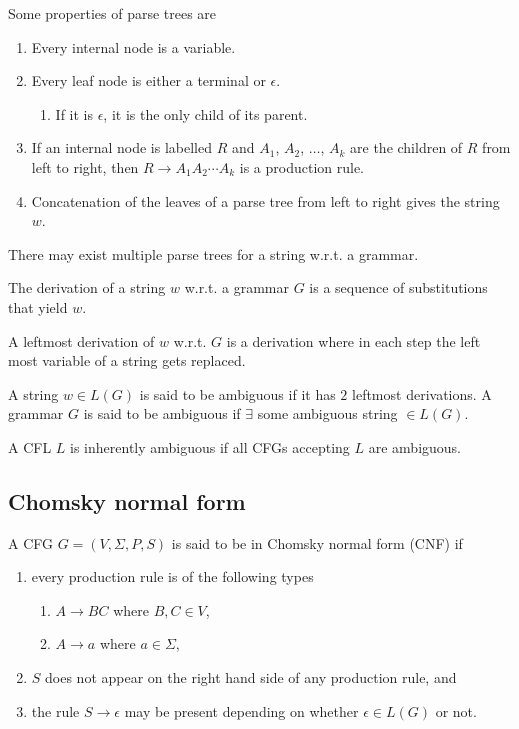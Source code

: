 \documentclass{article}
\begin{document}
Some properties of parse trees are

\begin{enumerate}
\item\label{item:25} Every internal node is a variable. 
\item\label{item:24} Every leaf node is either a terminal or $\epsilon$. 
\begin{enumerate}
\item\label{item:27} If it is $\epsilon$, it is the only child of its parent.
\end{enumerate} 
\item\label{item:28} If an internal node is labelled $R$ and $A_1$, $A_2$, $\ldots$, $A_k$ are the children of $R$ from left to right, then $R \to A_1A_2\cdots A_k$ is a production rule. 
\item\label{item:29} Concatenation of the leaves of a parse tree from left to right gives the string $w$.
\end{enumerate}

There may exist multiple parse trees for a string w.r.t. a grammar.

The derivation of a string $w$ w.r.t. a grammar $G$ is a sequence of substitutions that yield $w$.

A leftmost derivation of $w$ w.r.t. $G$ is a derivation where in each step the left most variable of a string gets replaced.

A string $w \in L(G)$ is said to be ambiguous if it has $2$ leftmost derivations. A grammar $G$ is said to be ambiguous if $\exists$ some ambiguous string $\in L(G)$.

A CFL $L$ is inherently ambiguous if all CFGs accepting $L$ are ambiguous.

\subsection{Chomsky normal form}

A CFG $G = (V, \Sigma, P, S)$ is said to be in Chomsky normal form (CNF) if 
\begin{enumerate}
\item\label{item:31} every production rule is of the following types \begin{enumerate}
\item\label{item:30} $A \to BC$ where $B, C \in V$,
\item\label{item:26} $A \to a$ where $a \in \Sigma$,
\end{enumerate} 
\item\label{item:32} $S$ does not appear on the right hand side of any production rule, and
\item\label{item:33} the rule $S\to \epsilon$ may be present depending on whether $\epsilon \in L(G)$ or not.
\end{enumerate}
\end{document}
